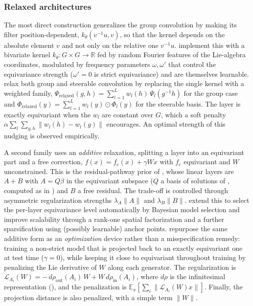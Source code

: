 \documentclass[mathematics,review,submit,moreauthors]{Definitions/mdpi}
\begin{document}
\subsubsection{Relaxed architectures}\label{sec:approx-relaxed}
The most direct construction generalizes the group convolution by making its filter position-dependent, $k_\theta(v^{-1}u,v)$, so that the kernel depends on the absolute element $v$ and not only on the relative one $v^{-1}u$.
\citet{ouderaa2022} implement this with a bivariate kernel $k_\theta:G\times G\to\mathbb{R}$ fed by random Fourier features of the Lie-algebra coordinates, modulated by frequency parameters $\omega,\omega'$ that control the equivariance strength ($\omega'=0$ is strict equivariance) and are themselves learnable.
\citet{wang2022p3icml} relax both group and steerable convolution by replacing the single kernel with a weighted family, $\Psi_{\mathrm{relaxed}}(g,h)=\sum_{l=1}^{L}w_l(h)\,\Psi_l(g^{-1}h)$ for the group case and $\Phi_{\mathrm{relaxed}}(y)=\sum_{l=1}^{L}w_l(y)\odot\Phi_l(y)$ for the steerable basis.
The layer is exactly equivariant when the $w_l$ are constant over $G$, which a soft penalty $\alpha\sum_{l}\sum_{g,h}\|w_l(h)-w_l(g)\|$ encourages.
An optimal strength of this nudging is observed empirically.

A second family uses an \emph{additive} relaxation, splitting a layer into an equivariant part and a free correction, $f(x)=f_e(x)+\gamma Wx$ with $f_e$ equivariant and $W$ unconstrained.
This is the residual-pathway prior of \citet{finzi2021anips}, whose linear layers are $A+B$ with $A=Q\beta$ in the equivariant subspace ($Q$ a basis of solutions of , computed as in \citet{finzi2021p3icml}) and $B$ a free residual.
The trade-off is controlled through asymmetric regularization strengths $\lambda_A\|A\|$ and $\lambda_B\|B\|$.
\citet{ouderaa2023} extend this to select the per-layer equivariance level automatically by Bayesian model selection and improve scalability through a rank-one spatial factorization and a further sparsification using (possibly learnable) anchor points.
\citet{pertigkiozoglou2024} repurpose the same additive form as an \emph{optimization} device rather than a misspecification remedy: training a non-strict model that is projected back to an exactly equivariant one at test time ($\gamma=0$), while keeping it close to equivariant throughout training by penalizing the Lie derivative of $W$ along each generator.
The regularization is $\mathcal{L}_{A_i}(W)=-\,d\rho_{\mathrm{out}}(A_i)\,W+W\,d\rho_{\mathrm{in}}(A_i)$, where $d\rho$ is the infinitesimal representation (), and the penalization is $\mathbb{E}_x[\sum_i\|\mathcal{L}_{A_i}(W)x\|]$.
Finally, the projection distance is also penalized, with a simple term $\|W\|$.
 
\end{document}
